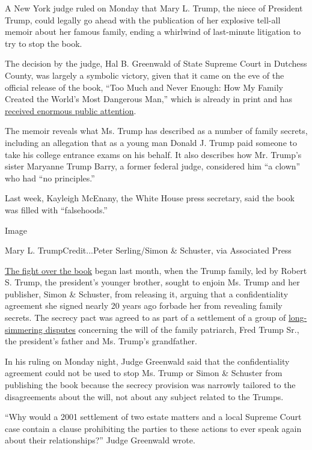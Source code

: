 A New York judge ruled on Monday that Mary L. Trump, the niece of
President Trump, could legally go ahead with the publication of her
explosive tell-all memoir about her famous family, ending a whirlwind of
last-minute litigation to try to stop the book.

The decision by the judge, Hal B. Greenwald of State Supreme Court in
Dutchess County, was largely a symbolic victory, given that it came on
the eve of the official release of the book, ``Too Much and Never
Enough: How My Family Created the World's Most Dangerous Man,'' which is
already in print and has
\href{https://www.nytimes.com/2020/07/07/us/politics/mary-trump-book.html}{received
enormous public attention}.

The memoir reveals what Ms. Trump has described as a number of family
secrets, including an allegation that as a young man Donald J. Trump
paid someone to take his college entrance exams on his behalf. It also
describes how Mr. Trump's sister Maryanne Trump Barry, a former federal
judge, considered him ``a clown'' who had ``no principles.''

Last week, Kayleigh McEnany, the White House press secretary, said the
book was filled with ``falsehoods.''

Image

Mary L. TrumpCredit...Peter Serling/Simon \& Schuster, via Associated
Press

\href{https://www.nytimes.com/2020/06/23/us/politics/mary-trump-book-court.html}{The
fight over the book} began last month, when the Trump family, led by
Robert S. Trump, the president's younger brother, sought to enjoin Ms.
Trump and her publisher, Simon \& Schuster, from releasing it, arguing
that a confidentiality agreement she signed nearly 20 years ago forbade
her from revealing family secrets. The secrecy pact was agreed to as
part of a settlement of a group of
\href{https://www.nytimes.com/2020/07/07/nyregion/mary-trump-book.html}{long-simmering
disputes} concerning the will of the family patriarch, Fred Trump Sr.,
the president's father and Ms. Trump's grandfather.

In his ruling on Monday night, Judge Greenwald said that the
confidentiality agreement could not be used to stop Ms. Trump or Simon
\& Schuster from publishing the book because the secrecy provision was
narrowly tailored to the disagreements about the will, not about any
subject related to the Trumps.

``Why would a 2001 settlement of two estate matters and a local Supreme
Court case contain a clause prohibiting the parties to these actions to
ever speak again about their relationships?'' Judge Greenwald wrote.

